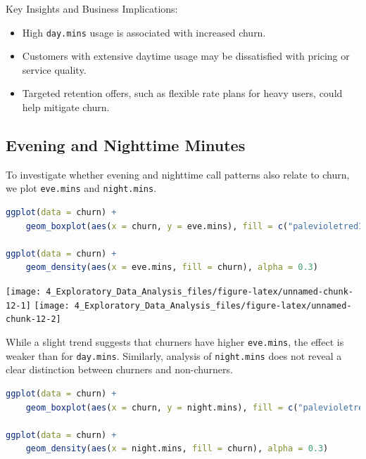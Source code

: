 \documentclass[
  11pt,
]{book}
\newcommand{\passthrough}[1]{#1}
\providecommand{\tightlist}{%
  \setlength{\itemsep}{0pt}\setlength{\parskip}{0pt}}
\theoremstyle{definition}
\theoremstyle{definition}
\theoremstyle{definition}
\theoremstyle{definition}
\theoremstyle{remark}
\begin{document}
Key Insights and Business Implications:

\begin{itemize}
\tightlist
\item
  High \passthrough{\lstinline!day.mins!} usage is associated with increased churn.\\
\item
  Customers with extensive daytime usage may be dissatisfied with pricing or service quality.\\
\item
  Targeted retention offers, such as flexible rate plans for heavy users, could help mitigate churn.
\end{itemize}

\subsection*{Evening and Nighttime Minutes}\label{evening-and-nighttime-minutes}


To investigate whether evening and nighttime call patterns also relate to churn, we plot \passthrough{\lstinline!eve.mins!} and \passthrough{\lstinline!night.mins!}.

\begin{lstlisting}[language=R]
ggplot(data = churn) +
    geom_boxplot(aes(x = churn, y = eve.mins), fill = c("palevioletred1", "darkseagreen1"))

ggplot(data = churn) +
    geom_density(aes(x = eve.mins, fill = churn), alpha = 0.3)
\end{lstlisting}

\texttt{[image: 4\_Exploratory\_Data\_Analysis\_files/figure-latex/unnamed-chunk-12-1]} \texttt{[image: 4\_Exploratory\_Data\_Analysis\_files/figure-latex/unnamed-chunk-12-2]}

While a slight trend suggests that churners have higher \passthrough{\lstinline!eve.mins!}, the effect is weaker than for \passthrough{\lstinline!day.mins!}. Similarly, analysis of \passthrough{\lstinline!night.mins!} does not reveal a clear distinction between churners and non-churners.

\begin{lstlisting}[language=R]
ggplot(data = churn) +
    geom_boxplot(aes(x = churn, y = night.mins), fill = c("palevioletred1", "darkseagreen1"))

ggplot(data = churn) +
    geom_density(aes(x = night.mins, fill = churn), alpha = 0.3)
\end{lstlisting}
\end{document}
